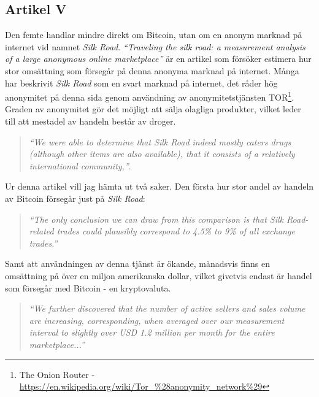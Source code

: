 \documentclass[a4paper,11pt,exjobb]{kth-mag}
\begin{document}
\subsection{Artikel V}
\label{V}
Den femte handlar mindre direkt om Bitcoin, utan om en anonym marknad på internet vid namnet \textit{Silk Road}. \textit{``Traveling the silk road: a measurement analysis of a large anonymous online marketplace''}\cite{Christ} är en artikel som försöker estimera hur stor omsättning som försegår på denna anonyma marknad på internet. Många har beskrivit \textit{Silk Road} som en svart marknad på internet, det råder hög anonymitet på denna sida genom användning av anonymitetstjänsten TOR\footnote{The Onion Router - \url{https://en.wikipedia.org/wiki/Tor_\%28anonymity_network\%29}}. Graden av anonymitet gör det möjligt att sälja olagliga produkter, vilket leder till att mestadel av handeln består av  droger.
\begin{quote}
\textit{``We were able to determine that Silk
Road indeed mostly caters drugs (although other items are also available), that it consists of a relatively international community,''}\cite[p.222]{Christ}.
\end{quote}

Ur denna artikel vill jag hämta ut två saker. Den första hur stor andel av handeln av Bitcoin försegår just på \textit{Silk Road}:
\begin{quote}
\textit{``The only conclusion we can draw from this comparison is that
Silk Road-related trades could plausibly correspond to 4.5\% to 9\%
of all exchange trades.''}\cite[p.220]{Christ}
\end{quote}

Samt att användningen av denna tjänst är ökande,  månadsvis finns en omsättning på över en miljon amerikanska dollar, vilket givetvis endast är handel som försegår med Bitcoin - en kryptovaluta. 
\begin{quote}
\textit{``We further discovered that the number of active
sellers and sales volume are increasing, corresponding, when averaged
over our measurement interval to slightly over USD 1.2 million per month for the entire marketplace...''}\cite[p.222]{Christ}
\end{quote}
\end{document}
